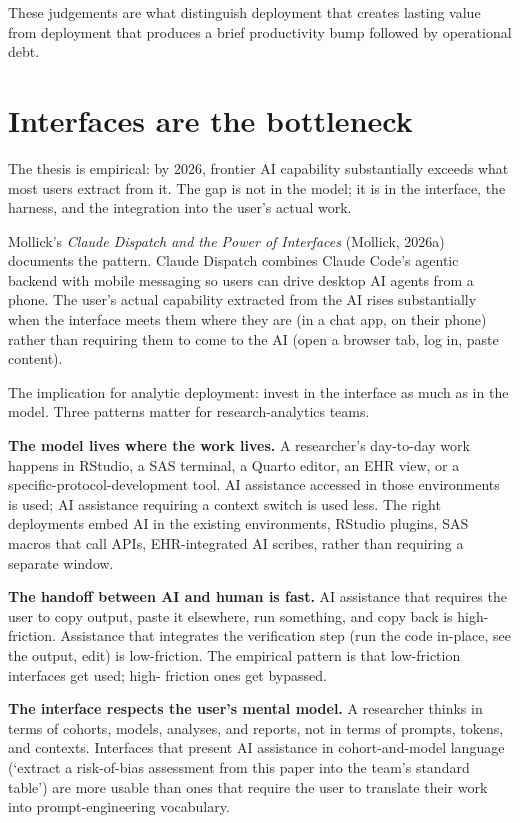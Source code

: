 \documentclass[
  letterpaper,
  11pt]{scrbook}
\begin{document}
These judgements are what distinguish deployment that creates lasting
value from deployment that produces a brief productivity bump followed
by operational debt.

\section{Interfaces are the
bottleneck}\label{interfaces-are-the-bottleneck}

The thesis is empirical: by 2026, frontier AI capability substantially
exceeds what most users extract from it. The gap is not in the model; it
is in the interface, the harness, and the integration into the user's
actual work.

Mollick's \emph{Claude Dispatch and the Power of Interfaces} (Mollick,
2026a) documents the pattern. Claude Dispatch combines Claude Code's
agentic backend with mobile messaging so users can drive desktop AI
agents from a phone. The user's actual capability extracted from the AI
rises substantially when the interface meets them where they are (in a
chat app, on their phone) rather than requiring them to come to the AI
(open a browser tab, log in, paste content).

The implication for analytic deployment: invest in the interface as much
as in the model. Three patterns matter for research-analytics teams.

\textbf{The model lives where the work lives.} A researcher's day-to-day
work happens in RStudio, a SAS terminal, a Quarto editor, an EHR view,
or a specific-protocol-development tool. AI assistance accessed in those
environments is used; AI assistance requiring a context switch is used
less. The right deployments embed AI in the existing environments,
RStudio plugins, SAS macros that call APIs, EHR-integrated AI scribes,
rather than requiring a separate window.

\textbf{The handoff between AI and human is fast.} AI assistance that
requires the user to copy output, paste it elsewhere, run something, and
copy back is high-friction. Assistance that integrates the verification
step (run the code in-place, see the output, edit) is low-friction. The
empirical pattern is that low-friction interfaces get used; high-
friction ones get bypassed.

\textbf{The interface respects the user's mental model.} A researcher
thinks in terms of cohorts, models, analyses, and reports, not in terms
of prompts, tokens, and contexts. Interfaces that present AI assistance
in cohort-and-model language (`extract a risk-of-bias assessment from
this paper into the team's standard table') are more usable than ones
that require the user to translate their work into prompt-engineering
vocabulary.
\end{document}
